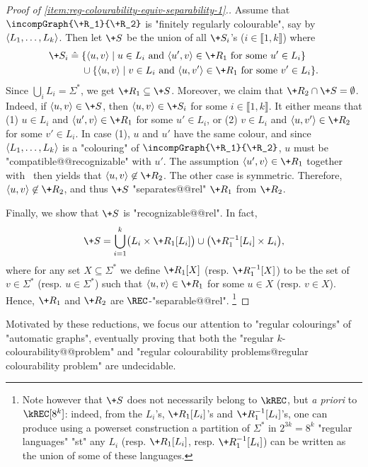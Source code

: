 \begin{proof}[Proof of \eqref{item:reg-colourability-equiv-separability-1}.]
    Assume that $\incompGraph{\+R_1}{\+R_2}$ is "finitely regularly colourable", say by
    $\langle L_1,\dotsc,L_k\rangle$. Then let $\+S$ be the union of all $\+S_i$'s ($i \in \lBrack 1,k\rBrack$) where
    \begin{align*}
        \+S_i \defeq\; & \{\tup{u,v} \mid u \in L_i \text{ and } \tup{u',v} \in \+R_1 \text{ for some } u' \in L_i \}\\
        & \cup \{\tup{u,v} \mid v \in L_i \text{ and } \tup{u,v'} \in \+R_1 \text{ for some } v' \in L_i \}.  
    \end{align*}
    Since $\bigcup_i L_i = \Sigma^*$, we get $\+R_1 \subseteq \+S$.
    Moreover, we claim that $\+R_2 \cap \+S = \emptyset$. Indeed, if $\tup{u,v} \in \+S$,
    then $\tup{u,v} \in \+S_i$ for some $i \in \lBrack 1,k\rBrack$. It either means that
    (1) $u\in L_i$ and $\tup{u',v} \in \+R_1$ for some $u' \in L_i$, or
    (2) $v\in L_i$ and $\tup{u,v'} \in \+R_2$
    for some $v' \in L_i$. In case (1), $u$ and $u'$
    have the same colour, and since $\langle L_1,\dotsc,L_k\rangle$ is a "colouring"
    of $\incompGraph{\+R_1}{\+R_2}$, $u$ must be "compatible@@recognizable" with $u'$.
    The assumption $\tup{u',v} \in \+R_1$ together with \compLpr\ then yields
    that $\tup{u,v} \not\in \+R_2$. The other case is symmetric.
    Therefore, $\tup{u,v} \not\in \+R_2$, and thus $\+S$ "separates@@rel" $\+R_1$ from $\+R_2$.

    Finally, we show that $\+S$ is "recognizable@@rel". In fact, 
    \[
        \+S = \bigcup_{i=1}^k \bigl(
            L_i \times \+R_1[L_i]
        \bigr) \cup \bigl(
            \+R_1^{-1}[L_i] \times L_i
        \bigr),
    \] 
    where for any set $X \subseteq \Sigma^*$ we define $\+R_1[X]$ (resp. $\+R_1^{-1}[X]$)
    to be the set of $v\in \Sigma^*$ (resp. $u \in \Sigma^*$) such that
    $\tup{u,v} \in \+R_1$ for some $u \in X$ (resp. $v\in X$).
    Hence, $\+R_1$ and $\+R_2$ are $\REC$-"separable@@rel".%
    \footnote{%
        Note however that $\+S$ does not necessarily belong to $\kREC$,
        but \emph{a priori} to $\kREC[8^k]$: indeed, from the
        $L_i$'s, $\+R_1[L_i]$'s and $\+R_1^{-1}[L_i]$'s,
        one can produce using a powerset construction a partition of $\Sigma^*$
        in $2^{3k} = 8^k$ "regular languages" "st" any $L_i$ (resp. $\+R_1[L_i]$,
        resp. $\+R_1^{-1}[L_i]$) can be written as the union of some of these languages.
    }
\end{proof}

Motivated by these reductions, we focus our attention to "regular colourings" of "automatic graphs",
eventually proving that both the "regular $k$-colourability@@problem" and
"regular colourability problems@regular colourability problem" are undecidable.
